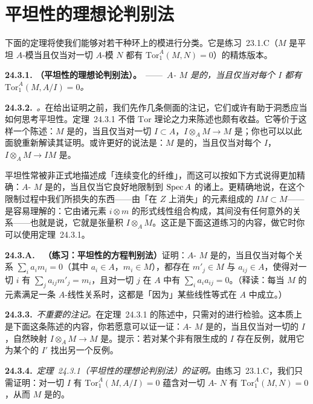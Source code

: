 
\section{平坦性的理想论判别法}

下面的定理将使我们能够对若干种环上的\trFlat{}模进行分类。它是\mbox{练习~23.1.C}（$M$ 是平坦 $A$-模当且仅当对一切 $A$-模 $N$ 都有 $\mathrm{Tor}^A_1(M,N)=0$）的精炼版本。

\textbf{24.3.1. \trhTheorem（平坦性的理想论判别法）。}\ ——\ \emph{$A$-\trModule{} $M$ 是\trFlat{}的，当且仅当对每个\trIdeal{} $I$ 都有 $\mathrm{Tor}^A_1(M,A/I)=0$。}

\textbf{24.3.2.}\ \emph{\trhRemark。}\quad 在给出证明之前，我们先作几条侧面的注记，它们或许有助于洞悉应当如何思考平坦性。\mbox{定理~24.3.1} 不借 $\mathrm{Tor}$ 理论之力来陈述也颇有收益。它等价于这样一个陈述：$M$ 是\trFlat{}的，当且仅当对一切\trIdeal{} $I\subset A$，$I\otimes_A M\to M$ 是\trInjectiveMap；你也可以以此面貌重新解读其证明。或许更好的说法是：$M$ 是\trFlat{}的，当且仅当对每个\trIdeal{} $I$，$I\otimes_A M\to IM$ 是\trIsomorphism。

平坦性常被非正式地描述成「连续变化的纤维」，而这可以按如下方式说得更加精确：$A$-\trModule{} $M$ 是\trFlat{}的，当且仅当它良好地限制到 $\operatorname{Spec} A$ 的诸\trClosedSubscheme{}上。更精确地说，在这个限制过程中我们所损失的东西——由「在 $Z$ 上消失」的元素组成的\trSubmodule{} $IM\subset M$——是容易理解的：它由诸元素 $i\otimes m$ 的形式线性组合构成，其间没有任何意外的关系——也就是说，它就是张量积 $I\otimes_A M$。这正是下面这道练习的内容，做它时你可以使用\mbox{定理~24.3.1}。

\textbf{24.3.A.}\ \hard\ \textbf{（练习：平坦性的方程判别法）}\quad 证明：$A$-\trModule{} $M$ 是\trFlat{}的，当且仅当对每个关系 $\sum_i a_i m_i=0$（其中 $a_i\in A$，$m_i\in M$），都存在 $m'_j\in M$ 与 $a_{ij}\in A$，使得对一切 $i$ 有 $\sum_j a_{ij}m'_j=m_i$，且对一切 $j$ 在 $A$ 中有 $\sum_i a_i a_{ij}=0$。（释读：每当 $M$ 的元素满足一条 $A$-线性关系时，这都是「因为」某些线性等式在 $A$ 中成立。）

\textbf{24.3.3.}\ \emph{不重要的注记。}\quad 在\mbox{定理~24.3.1} 的陈述中，只需对\trFinitelyGenerated{}的\trIdeal{}进行检验。这本质上是下面这条陈述的内容，你若愿意可以证一证：$A$-\trModule{} $M$ 是\trFlat{}的，当且仅当对一切\trFinitelyGenerated{}的\trIdeal{} $I$，自然映射 $I\otimes_A M\to M$ 是\trInjectiveMap。提示：若对某个非有限生成的\trIdeal{} $I$ 存在反例，就用它为某个\trFinitelyGenerated{}的\trIdeal{} $I'$ 找出另一个反例。

\textbf{24.3.4.}\ \emph{\mbox{定理~24.3.1}（平坦性的理想论判别法）的证明。}\quad 由\mbox{练习~23.1.C}，我们只需证明：对一切 $I$ 有 $\mathrm{Tor}^A_1(M,A/I)=0$ 蕴含对一切 $A$-\trModule{} $N$ 有 $\mathrm{Tor}^A_1(M,N)=0$，从而 $M$ 是\trFlat{}的。

